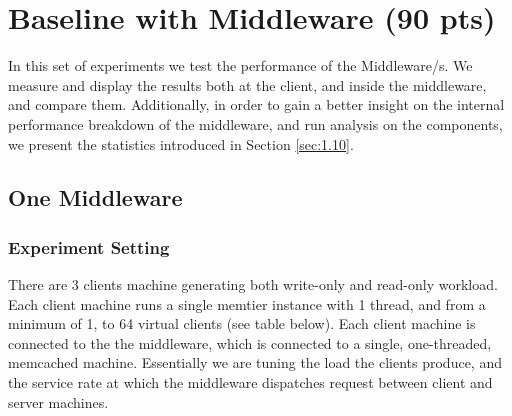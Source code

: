 \documentclass[11pt,a4paper]{article}
\begin{document}
\section{Baseline with Middleware (90 pts)}
\label{sec:3.1}

In this set of experiments we test the performance of the Middleware/s. 
We measure and display the results both at the client, and inside the middleware, and compare them.
Additionally, in order to gain a better insight on the internal performance breakdown of the middleware, and run analysis on the components, we present the statistics introduced in Section \ref{sec:1.10}.

\subsection{One Middleware}

\subsubsection{Experiment Setting}

There are 3 clients machine generating both write-only and read-only workload. Each client machine runs a single memtier instance with 1 thread, and from a minimum of 1, to 64 virtual clients (see table below).
Each client machine is connected to the the middleware, which is connected to a single, one-threaded, memcached machine.
Essentially we are tuning the load the clients produce, and the service rate at which the middleware dispatches request between client and server machines. 
\end{document}
